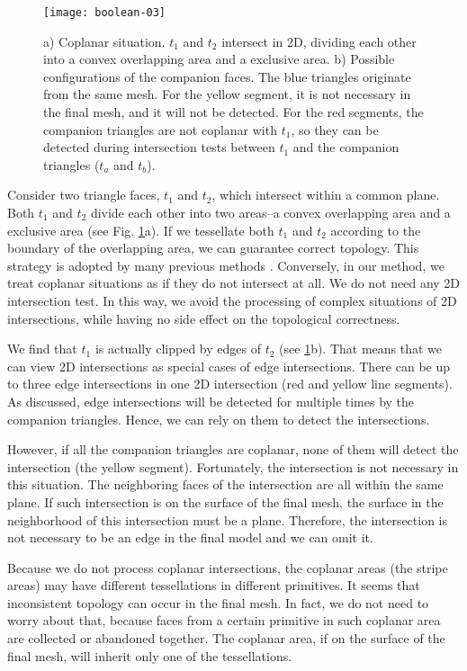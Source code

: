 \begin{figure}[t]
\centering
\texttt{[image: boolean-03]}
\caption{a) Coplanar situation. $t_1$ and $t_2$ intersect in 2D, dividing each other into a convex overlapping area and a exclusive area. b) Possible configurations of the companion faces. The blue triangles originate from the same mesh. For the yellow segment, it is not necessary in the final mesh, and it will not be detected. For the red segments, the companion triangles are not coplanar with $t_1$, so they can be detected during intersection tests between $t_1$ and the companion triangles ($t_a$ and $t_b$).}
\label{fig:coplanar}
\end{figure}


Consider two triangle faces, $t_1$ and $t_2$, which intersect within a common plane. Both $t_1$ and $t_2$ divide each other into two areas--a convex overlapping area and a exclusive area (see Fig. \ref{fig:coplanar}a). If we tessellate both $t_1$ and $t_2$ according to the boundary of the overlapping area, we can guarantee correct topology. This strategy is adopted by many previous methods \cite{feito2013fast,zhou2016mesh}. Conversely, in our method, we treat coplanar situations as if they do not intersect at all. We do not need any 2D intersection test. In this way, we avoid the processing of complex situations of 2D intersections, while having no side effect on the topological correctness.

We find that $t_1$ is actually clipped by edges of $t_2$ (see \ref{fig:coplanar}b). That means that we can view 2D intersections as special cases of edge intersections. There can be up to three edge intersections in one 2D intersection (red and yellow line segments). As discussed, edge intersections will be detected for multiple times by the companion triangles. Hence, we can rely on them to detect the intersections.

However, if all the companion triangles are coplanar, none of them will detect the intersection (the yellow segment). Fortunately, the intersection is not necessary in this situation. The neighboring faces of the intersection are all within the same plane. If such intersection is on the surface of the final mesh, the surface in the neighborhood of this intersection must be a plane. Therefore, the intersection is not necessary to be an edge in the final model and we can omit it.

Because we do not process coplanar intersections, the coplanar areas (the stripe areas) may have different tessellations in different primitives. It seems that inconsistent topology can occur in the final mesh. In fact, we do not need to worry about that, because faces from a certain primitive in such coplanar area are collected or abandoned together. The coplanar area, if on the surface of the final mesh, will inherit only one of the tessellations.
